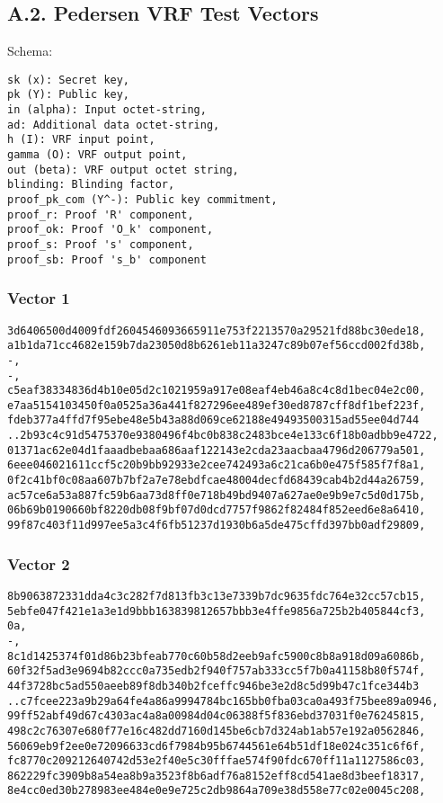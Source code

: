 \documentclass[
]{article}
\begin{document}
\hypertarget{a.2.-pedersen-vrf-test-vectors}{%
\subsection{A.2. Pedersen VRF Test
Vectors}\label{a.2.-pedersen-vrf-test-vectors}}

Schema:

\begin{verbatim}
sk (x): Secret key,
pk (Y): Public key,
in (alpha): Input octet-string,
ad: Additional data octet-string,
h (I): VRF input point,
gamma (O): VRF output point,
out (beta): VRF output octet string,
blinding: Blinding factor,
proof_pk_com (Y^-): Public key commitment,
proof_r: Proof 'R' component,
proof_ok: Proof 'O_k' component,
proof_s: Proof 's' component,
proof_sb: Proof 's_b' component
\end{verbatim}

\hypertarget{vector-1-1}{%
\subsubsection{Vector 1}\label{vector-1-1}}

\begin{verbatim}
3d6406500d4009fdf2604546093665911e753f2213570a29521fd88bc30ede18,
a1b1da71cc4682e159b7da23050d8b6261eb11a3247c89b07ef56ccd002fd38b,
-,
-,
c5eaf38334836d4b10e05d2c1021959a917e08eaf4eb46a8c4c8d1bec04e2c00,
e7aa5154103450f0a0525a36a441f827296ee489ef30ed8787cff8df1bef223f,
fdeb377a4ffd7f95ebe48e5b43a88d069ce62188e49493500315ad55ee04d744
..2b93c4c91d5475370e9380496f4bc0b838c2483bce4e133c6f18b0adbb9e4722,
01371ac62e04d1faaadbebaa686aaf122143e2cda23aacbaa4796d206779a501,
6eee046021611ccf5c20b9bb92933e2cee742493a6c21ca6b0e475f585f7f8a1,
0f2c41bf0c08aa607b7bf2a7e78ebdfcae48004decfd68439cab4b2d44a26759,
ac57ce6a53a887fc59b6aa73d8ff0e718b49bd9407a627ae0e9b9e7c5d0d175b,
06b69b0190660bf8220db08f9bf07d0dcd7757f9862f82484f852eed6e8a6410,
99f87c403f11d997ee5a3c4f6fb51237d1930b6a5de475cffd397bb0adf29809,
\end{verbatim}

\hypertarget{vector-2-1}{%
\subsubsection{Vector 2}\label{vector-2-1}}

\begin{verbatim}
8b9063872331dda4c3c282f7d813fb3c13e7339b7dc9635fdc764e32cc57cb15,
5ebfe047f421e1a3e1d9bbb163839812657bbb3e4ffe9856a725b2b405844cf3,
0a,
-,
8c1d1425374f01d86b23bfeab770c60b58d2eeb9afc5900c8b8a918d09a6086b,
60f32f5ad3e9694b82ccc0a735edb2f940f757ab333cc5f7b0a41158b80f574f,
44f3728bc5ad550aeeb89f8db340b2fceffc946be3e2d8c5d99b47c1fce344b3
..c7fcee223a9b29a64fe4a86a9994784bc165bb0fba03ca0a493f75bee89a0946,
99ff52abf49d67c4303ac4a8a00984d04c06388f5f836ebd37031f0e76245815,
498c2c76307e680f77e16c482dd7160d145be6cb7d324ab1ab57e192a0562846,
56069eb9f2ee0e72096633cd6f7984b95b6744561e64b51df18e024c351c6f6f,
fc8770c209212640742d53e2f40e5c30fffae574f90fdc670ff11a1127586c03,
862229fc3909b8a54ea8b9a3523f8b6adf76a8152eff8cd541ae8d3beef18317,
8e4cc0ed30b278983ee484e0e9e725c2db9864a709e38d558e77c02e0045c208,
\end{verbatim}
\end{document}
